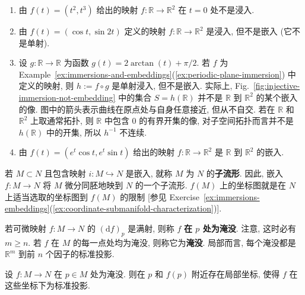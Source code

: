 
\begin{RiemannExample}\label{ex:immersions-and-embeddings}
\begin{enumerate}[label=(\arabic*),ref=\arabic*,leftmargin=*]
\item 由 $f(t)=(t^2,t^3)$ 给出的映射 $f:\mathbb{R}\to\mathbb{R}^2$ 在 $t=0$ 处不是浸入.
\item\label{ex:periodic-plane-immersion} 由 $f(t)=(\cos t,\sin 2t)$ 定义的映射 $f:\mathbb{R}\to\mathbb{R}^2$ 是浸入, 但不是嵌入 (它不是单射).
\item 设 $g:\mathbb{R}\to\mathbb{R}$ 为函数 $g(t)=2\arctan(t)+\pi/2$. 若 $f$ 为 Example~\ref{ex:immersions-and-embeddings}(\ref{ex:periodic-plane-immersion}) 中定义的映射, 则 $h:=f\circ g$ 是单射浸入, 但不是嵌入. 实际上, Fig.~\ref{fig:injective-immersion-not-embedding} 中的集合 $S=h(\mathbb{R})$ 并不是 $\mathbb{R}$ 到 $\mathbb{R}^2$ 的某个嵌入的像. 图中的箭头表示曲线在原点处与自身任意接近, 但从不自交. 若在 $\mathbb{R}$ 和 $\mathbb{R}^2$ 上取通常拓扑, 则 $\mathbb{R}$ 中包含 $0$ 的有界开集的像, 对子空间拓扑而言并不是 $h(\mathbb{R})$ 中的开集, 所以 $h^{-1}$ 不连续.
\item 由 $f(t)=(e^t\cos t,e^t\sin t)$ 给出的映射 $f:\mathbb{R}\to\mathbb{R}^2$ 是 $\mathbb{R}$ 到 $\mathbb{R}^2$ 的嵌入.
\end{enumerate}
\end{RiemannExample}

若 $M\subset N$ 且包含映射 $i:M\hookrightarrow N$ 是嵌入, 就称 $M$ 为 $N$ 的\textbf{子流形}. 因此, 嵌入 $f:M\to N$ 将 $M$ 微分同胚地映到 $N$ 的一个子流形. $f(M)$ 上的坐标图就是在 $N$ 上适当选取的坐标图到 $f(M)$ 的限制 [参见 Exercise~\ref{ex:immersions-embeddings}(\ref{ex:coordinate-submanifold-characterization})].

若可微映射 $f:M\to N$ 的 $(\mathrm{d}f)_p$ 是满射, 则称 $f$ \textbf{在 $p$ 处为淹没}. 注意, 这时必有 $m\geq n$. 若 $f$ 在 $M$ 的每一点处均为淹没, 则称它为\textbf{淹没}. 局部而言, 每个淹没都是 $\mathbb{R}^m$ 到前 $n$ 个因子的标准投影.

\begin{RiemannTheorem}\label{thm:local-submersion-normal-form}
设 $f:M\to N$ 在 $p\in M$ 处为淹没. 则在 $p$ 和 $f(p)$ 附近存在局部坐标, 使得 $f$ 在这些坐标下为标准投影.
\end{RiemannTheorem}

